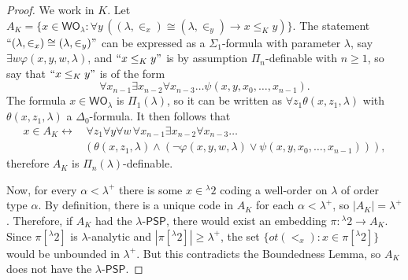 \documentclass[10pt,a4paper]{amsart}
\begin{document}
\begin{proof} 
	We work in $K$. Let $A_{K}=\{x\in \mathsf{WO}_{\lambda}:\forall y\,((\lambda,\in_x)\cong(\lambda,\in_y)\rightarrow x\leq_{K}y)\}$. The statement $``(\lambda,\in_x)\cong(\lambda,\in_y)"$ can be expressed as a $\Sigma_1$-formula with parameter $\lambda$, say $\exists w\varphi(x,y,w,\lambda)$, and $``x\leq_{K}y"$ is by assumption  $\Pi_{n}$-definable with $n\geq 1$, so say that $``x\leq_{K}y"$ is of the form $$\forall x_{n-1}\exists x_{n-2}\forall x_{n-3}\ldots\psi(x,y,x_0,\ldots,x_{n-1}).$$ The formula $x\in \mathsf{WO}_{\lambda}$ is $\Pi_1(\lambda)$, so it can be written as $\forall z_1\theta(x,z_1,\lambda)$ with $\theta(x,z_1,\lambda)$ a $\Delta_0$-formula. It then follows that
	\begin{equation*}
		\begin{split}
			x\in A_{K} \leftrightarrow& \,\forall z_1\forall y\forall w\,\forall x_{n-1}\exists x_{n-2}\forall x_{n-3}\ldots \\&(\theta(x,z_1,\lambda)\wedge(\neg\varphi(x,y,w,\lambda)\vee\psi(x,y,x_{0},\ldots,x_{n-1}))),
		\end{split}
	\end{equation*}
	therefore $A_{K}$ is $\Pi_n(\lambda)$-definable.
	
	Now, for every $\alpha<\lambda^{+}$ there is some $x\in {}^{\lambda}2$ coding a well-order on $\lambda$ of order type $\alpha$. By definition, there is a unique code in $A_{K}$ for each $\alpha<\lambda^{+}$, so $|A_{K}|=\lambda^{+}$. Therefore, if $A_{K}$ had the $\lambda$-$\mathsf{PSP}$, there would exist an embedding $\pi:{}^{\lambda}2\to A_{K}$. Since $\pi[{}^{\lambda}2]$ is $\lambda$-analytic and $|\pi[{}^{\lambda}2] |\geq \lambda^{+}$, the set $\{ot(<_{x}):x\in\pi[{}^{\lambda}2]\}$ would be unbounded in $\lambda^{+}$. But this contradicts the Boundedness Lemma, so $A_{K}$ does not have the $\lambda$-$\mathsf{PSP}$. 
\end{proof}
\end{document}
